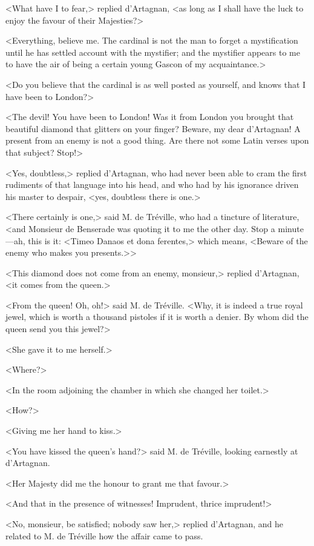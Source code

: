 <What have I to fear,> replied d'Artagnan, <as long as I shall have the luck to enjoy the favour of their Majesties?> 

<Everything, believe me. The cardinal is not the man to forget a mystification until he has settled account with the mystifier; and the mystifier appears to me to have the air of being a certain young Gascon of my acquaintance.> 

<Do you believe that the cardinal is as well posted as yourself, and knows that I have been to London?> 

<The devil! You have been to London! Was it from London you brought that beautiful diamond that glitters on your finger? Beware, my dear d'Artagnan! A present from an enemy is not a good thing. Are there not some Latin verses upon that subject? Stop!> 

<Yes, doubtless,> replied d'Artagnan, who had never been able to cram the first rudiments of that language into his head, and who had by his ignorance driven his master to despair, <yes, doubtless there is one.> 

<There certainly is one,> said M. de Tréville, who had a tincture of literature, <and Monsieur de Benserade was quoting it to me the other day. Stop a minute---ah, this is it: <Timeo Danaos et dona ferentes,> which means, <Beware of the enemy who makes you presents.>> 

<This diamond does not come from an enemy, monsieur,> replied d'Artagnan, <it comes from the queen.> 

<From the queen! Oh, oh!> said M. de Tréville. <Why, it is indeed a true royal jewel, which is worth a thousand pistoles if it is worth a denier. By whom did the queen send you this jewel?> 

<She gave it to me herself.> 

<Where?> 

<In the room adjoining the chamber in which she changed her toilet.> 

<How?> 

<Giving me her hand to kiss.> 

<You have kissed the queen's hand?> said M. de Tréville, looking earnestly at d'Artagnan. 

<Her Majesty did me the honour to grant me that favour.> 

<And that in the presence of witnesses! Imprudent, thrice imprudent!> 

<No, monsieur, be satisfied; nobody saw her,> replied d'Artagnan, and he related to M. de Tréville how the affair came to pass. 

